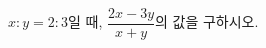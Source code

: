 \hspace*{2mm}\begin{minipage}[t]{\dimexpr\linewidth-2mm\relax}\vspace{0pt}
$x:y=2:3$일 때, $\dfrac{2x-3y}{x+y}$의 값을 구하시오. \end{minipage}
